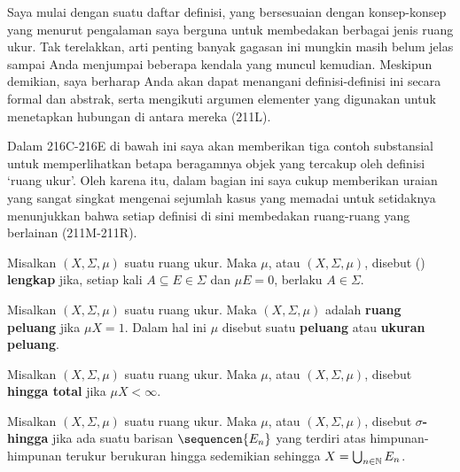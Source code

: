      
\def\chaptername{Taksonomi ruang ukur}
\def\sectionname{Definisi}
     
     
Saya mulai dengan suatu daftar definisi, yang bersesuaian dengan
konsep-konsep yang menurut pengalaman saya berguna untuk membedakan
berbagai jenis ruang ukur.   Tak terelakkan, arti penting banyak gagasan
ini mungkin masih belum jelas sampai Anda menjumpai beberapa kendala
yang muncul kemudian.   Meskipun demikian, saya berharap Anda akan
dapat menangani definisi-definisi ini secara formal dan abstrak, serta
mengikuti argumen elementer yang digunakan untuk menetapkan hubungan
di antara mereka (211L).
     
Dalam 216C-216E %
di bawah ini saya akan memberikan tiga contoh substansial untuk
memperlihatkan betapa beragamnya objek yang tercakup oleh definisi
`ruang ukur'.   Oleh karena itu, dalam bagian ini saya cukup
memberikan uraian yang sangat singkat mengenai sejumlah kasus yang
memadai untuk setidaknya menunjukkan bahwa setiap definisi di sini
membedakan ruang-ruang yang berlainan (211M-211R).
     
 Misalkan $(X,\Sigma,\mu)$ suatu ruang ukur.
Maka $\mu$, atau $(X,\Sigma,\mu)$, disebut ({\bf \Caratheodory}) {\bf
lengkap} jika, setiap kali $A\subseteq E\in\Sigma$ dan $\mu E=0$,
berlaku $A\in\Sigma$.
     
 Misalkan $(X,\Sigma,\mu)$ suatu ruang ukur.
Maka $(X,\Sigma,\mu)$ adalah {\bf ruang peluang} jika $\mu X=1$.
Dalam hal ini $\mu$ disebut suatu {\bf peluang} atau {\bf ukuran
peluang}.
     
 Misalkan $(X,\Sigma,\mu)$ suatu ruang ukur.
Maka $\mu$, atau $(X,\Sigma,\mu)$, disebut {\bf hingga total} jika $\mu
X<\infty$.
     
 Misalkan $(X,\Sigma,\mu)$ suatu ruang ukur.
Maka $\mu$, atau $(X,\Sigma,\mu)$, disebut {\bf $\sigma$-hingga} jika
ada suatu barisan $\sequencen{E_n}$ yang terdiri atas himpunan-himpunan
terukur berukuran hingga sedemikian sehingga
$X=\bigcup_{n\in\Bbb N}E_n$.
     
     
